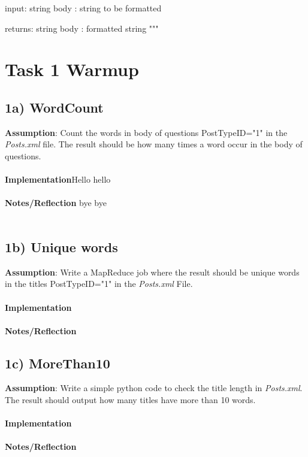 \documentclass[fleqn,10pt]{wlscirep}
\begin{document}
input:
  string body : string to be formatted

returns:
  string body : formatted string
"""


\section*{Task 1 Warmup}
\subsection*{1a) WordCount}
\textbf{Assumption}: Count the words in body of questions PostTypeID="1"  in the \textit{Posts.xml}  file. The result should be how many times a word occur in the body of questions.\\ \\
\textbf{Implementation}Hello hello \\ \\
\textbf{Notes/Reflection} bye bye  \\ \\



\subsection*{1b) Unique words}
\textbf{Assumption}: Write a MapReduce job where the result should be unique words in the titles PostTypeID="1" in the \textit{Posts.xml} File. \\ \\
\textbf{Implementation}  \\ \\
\textbf{Notes/Reflection}


\subsection*{1c) MoreThan10}
\textbf{Assumption}: Write a simple python code to check the title length in \textit{Posts.xml}. The result should output how many titles have more than 10 words.  \\ \\
\textbf{Implementation}  \\ \\
\textbf{Notes/Reflection}

\end{document}

